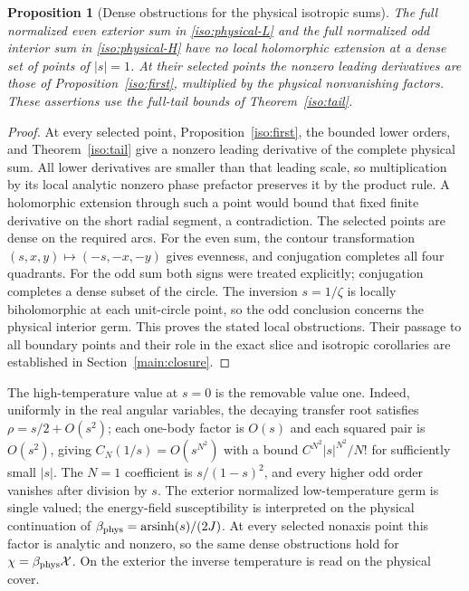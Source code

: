 \documentclass[11pt]{article}
\numberwithin{equation}{section}
\newtheorem{proposition}[theorem]{Proposition}
\theoremstyle{definition}
\begin{document}
\begin{proposition}[Dense obstructions for the physical isotropic sums]
\label{iso:local-obstruction}
The full normalized even exterior sum in \eqref{iso:physical-L}
and the full normalized odd interior sum in \eqref{iso:physical-H}
have no local holomorphic extension at a dense set of points of
\(|s|=1\). At their selected points the nonzero leading derivatives
are those of Proposition~\ref{iso:first}, multiplied by the physical
nonvanishing factors. These assertions use the full-tail
bounds of Theorem~\ref{iso:tail}.
\end{proposition}
\begin{proof}
At every selected point, Proposition~\ref{iso:first}, the bounded lower
orders, and Theorem~\ref{iso:tail} give a nonzero leading derivative of
the complete physical sum. All lower derivatives are smaller than that
leading scale, so multiplication by its local analytic nonzero phase
prefactor preserves it by the product rule. A holomorphic extension
through such a point would bound that fixed finite derivative on the
short radial segment, a contradiction. The selected points are dense on
the required arcs. For the even sum, the contour transformation
$(s,x,y)\mapsto(-s,-x,-y)$ gives evenness, and conjugation completes
all four quadrants. For the odd sum both signs were treated explicitly;
conjugation completes a dense subset of the circle. The inversion
\(s=1/\zeta\) is locally biholomorphic at each unit-circle point,
so the odd conclusion concerns the physical interior germ. This proves
the stated local obstructions. Their passage to all boundary points and
their role in the exact slice and isotropic corollaries are established
in Section~\ref{main:closure}.
\end{proof}

The high-temperature value at $s=0$ is the removable value one.
Indeed, uniformly in the real angular
variables, the decaying transfer root satisfies $\rho=s/2+O(s^2)$;
each one-body factor is $O(s)$ and each
squared pair is $O(s^2)$, giving $C_N(1/s)=O(s^{N^2})$ with a
bound $C^{N^2}|s|^{N^2}/N!$ for sufficiently small $|s|$.
The $N=1$ coefficient is $s/(1-s)^2$, and every higher odd order
vanishes after division by $s$. The exterior normalized
low-temperature germ is single valued; the energy-field susceptibility
is interpreted on the physical continuation of
$\beta_{\rm phys}=\operatorname{arsinh}(s)/(2J)$.
At every selected nonaxis point this factor is analytic and nonzero,
so the same dense obstructions hold for $\chi=\beta_{\rm phys}\mathcal X$.
On the exterior the inverse temperature is read on the physical cover.
\end{document}

